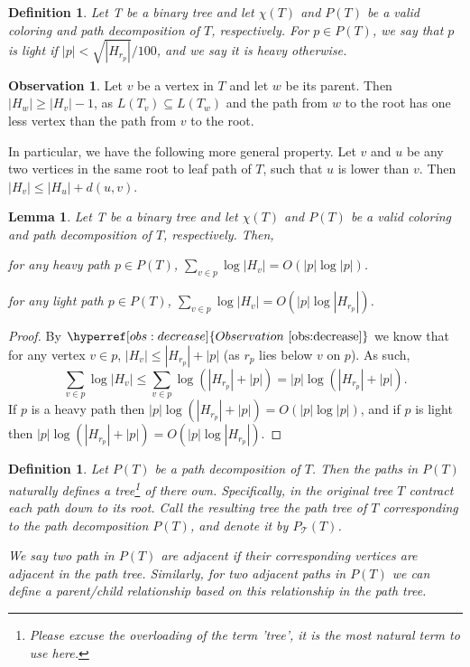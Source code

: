 \documentclass[11pt]{article}
\newtheorem{lemma}[theorem]{Lemma}
\newtheorem{definition}[theorem]{Definition}
\theoremstyle{definition}
\newtheorem{observation}{Observation}
\newcommand{\Obs}[1]{\hyperref[obs:#1]{Observation~\ref*{obs:#1}}} %
\begin{document}
\begin{definition}
 Let T be a binary tree and let $\chi(T)$ and $P(T)$ be a valid coloring and path decomposition of $T$, respectively.  
 For $p\in P(T)$, we say that $p$ is \emph{light} if $|p| < \sqrt{|H_{r_p}|}/100$, and we say it is \emph{heavy} otherwise.
\end{definition}

\begin{observation}
\label{obs:decrease}
 Let $v$ be a vertex in $T$ and let $w$ be its parent.  Then $|H_w| \geq |H_v| -1$, as $L(T_v) \subseteq L(T_w)$ and the path from 
 $w$ to the root has one less vertex than the path from $v$ to the root.
 
 In particular, we have the following more general property.
 Let $v$ and $u$ be any two vertices in the same root to leaf path of $T$, such that $u$ is lower than $v$.  
 Then $|H_v| \leq |H_u| + d(u,v)$. 
\end{observation}


\begin{lemma}
\label{lem:pathBounds}
 Let T be a binary tree and let $\chi(T)$ and $P(T)$ be a valid coloring and path decomposition of $T$, respectively.
 Then, 
 \begin{compactenum}
  \item for any heavy path $p\in P(T)$, $\sum_{v\in p} \log |H_v| = O(|p| \log |p|)$.
  \item for any light path $p\in P(T)$, $\sum_{v\in p} \log |H_v| = O(|p| \log |H_{r_p}|)$.
 \end{compactenum}
\end{lemma}
\begin{proof}
 By $\Obs{decrease}$ we know that for any vertex $v\in p$, $|H_v|\leq |H_{r_p}| + |p|$ (as $r_p$ lies below $v$ on $p$).
 As such, 
 \[
 \sum_{v\in p} \log |H_v| \leq \sum_{v\in p} \log(|H_{r_p}| + |p|)  = |p| \log (|H_{r_p}| + |p|).
 \]
 If $p$ is a heavy path then $|p| \log (|H_{r_p}| + |p|) = O(|p| \log |p|)$, and if $p$ is light then 
 $|p| \log (|H_{r_p}| + |p|) = O(|p| \log |H_{r_p}| )$.
\end{proof}

\newcommand{\pathTree}{P_{\mathcal{T}}}
\newcommand{\pathTreeA}{\mathcal{P}_{\mathcal{T}}}
\begin{definition}
Let $P(T)$ be a path decomposition of $T$.  Then the paths in $P(T)$ naturally defines a tree\footnote{Please excuse the 
overloading of the term 'tree', it is the most natural term to use here.} of there own.  Specifically, in the original 
tree $T$ contract each path down to its root.  Call the resulting tree the \emph{path tree} of $T$ corresponding to 
the path decomposition $P(T)$, and denote it by $\pathTree(T)$.

We say two path in $P(T)$ are adjacent if their corresponding vertices are adjacent in the path tree.  Similarly, for 
two adjacent paths in $P(T)$ we can define a parent/child relationship based on this relationship in the path tree. 
\end{definition}
\end{document}
